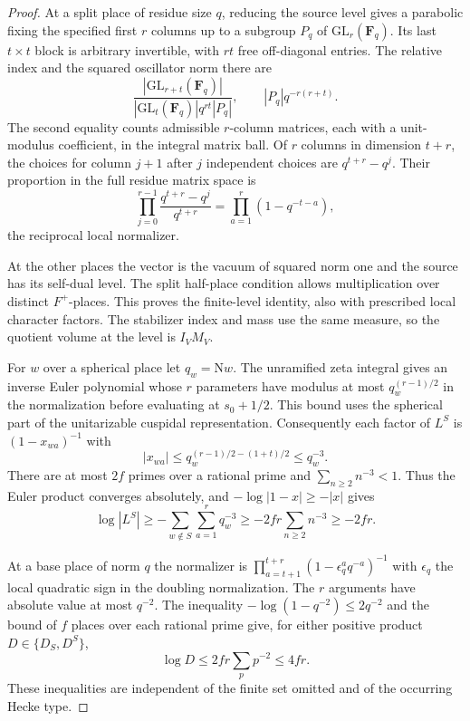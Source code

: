 \begin{proof}

At a split place of residue size \(q\), reducing the
source level gives a parabolic fixing the specified
first \(r\) columns up to a subgroup \(P_q\) of
\(\mathrm{GL}_r(\mathbf F_q)\). Its last \(t\times t\)
block is arbitrary invertible, with \(rt\) free
off-diagonal entries. The relative index and
the squared oscillator norm there are
\[
 \frac{|\mathrm{GL}_{r+t}(\mathbf F_q)|}
      {|\mathrm{GL}_t(\mathbf F_q)|q^{rt}|P_q|},
 \qquad |P_q|q^{-r(r+t)}.
\]
The second equality counts admissible \(r\)-column
matrices, each with a unit-modulus coefficient, in
the integral matrix ball. Of \(r\) columns in dimension \(t+r\), the choices for column
\(j+1\) after \(j\) independent choices are \(q^{t+r}-q^j\).
Their proportion in the full residue matrix space is
\[
 \prod_{j=0}^{r-1}\frac{q^{t+r}-q^j}{q^{t+r}}
       =\prod_{a=1}^r(1-q^{-t-a}),
\]
the reciprocal local normalizer.

At the other places the vector is the
vacuum of squared norm one and the source has its
self-dual level. The split half-place condition allows
multiplication over distinct \(F^+\)-places. This
proves the finite-level identity, also with prescribed
local character factors. The stabilizer index and mass use
the same measure, so the quotient volume at the level
is \(I_VM_V\).

For \(w\) over a spherical place let \(q_w=\mathrm Nw\).
The unramified zeta integral gives an inverse Euler
polynomial whose \(r\) parameters have modulus at most
\(q_w^{(r-1)/2}\) in the normalization before evaluating
at \(s_0+1/2\). This bound uses the spherical part of the
unitarizable cuspidal representation. Consequently
each factor of \(L^S\) is \((1-x_{wa})^{-1}\) with
\[
 |x_{wa}|\le q_w^{(r-1)/2-(1+t)/2}\le q_w^{-3}.
\]
There are at most \(2f\) primes over a rational
prime and \(\sum_{n\ge2}n^{-3}<1\). Thus the Euler
product converges absolutely, and
\(-\log|1-x|\ge-|x|\) gives
\[
 \log|L^S|\ge-\sum_{w\notin S}\sum_{a=1}^r q_w^{-3}
           \ge-2fr\sum_{n\ge2}n^{-3}\ge-2fr .
\]

At a base place of norm \(q\)
the normalizer is
\(\prod_{a=t+1}^{t+r}(1-\epsilon_q^a q^{-a})^{-1}\)
with \(\epsilon_q\) the local quadratic sign in the
doubling normalization. The \(r\) arguments have
absolute value at most \(q^{-2}\). The inequality \(-\log(1-q^{-2})\le2q^{-2}\) and the bound of \(f\) places over each rational prime give, for either positive product \(D\in\{D_S,D^S\}\),
\[
 \log D\le 2fr\sum_p p^{-2}\le4fr .
\] These inequalities are independent of
the finite set omitted and of the occurring Hecke type.


\end{proof}

